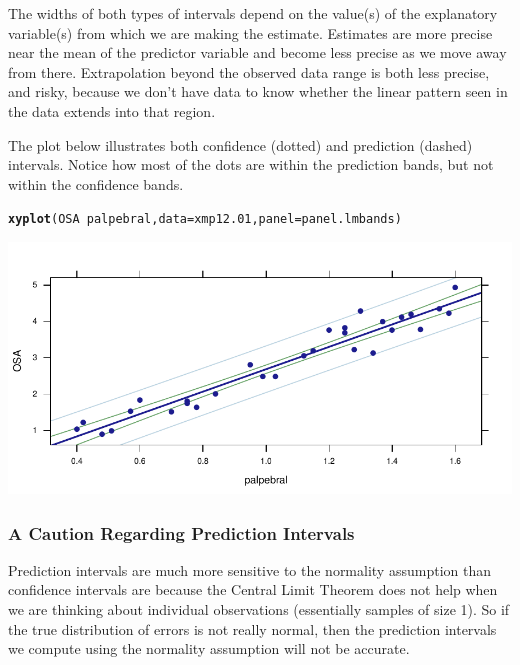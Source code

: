 \documentclass[twoside]{book}\usepackage[]{graphicx}\usepackage[]{xcolor}
\makeatletter
\newcommand{\hlopt}[1]{\textcolor[rgb]{0,0,0}{#1}}%
\newcommand{\hlstd}[1]{\textcolor[rgb]{0.345,0.345,0.345}{#1}}%
\newcommand{\hlkwc}[1]{\textcolor[rgb]{0.333,0.667,0.333}{#1}}%
\newcommand{\hlkwd}[1]{\textcolor[rgb]{0.737,0.353,0.396}{\textbf{#1}}}%
\newenvironment{kframe}{%
 \def\at@end@of@kframe{}%
 \ifinner\ifhmode%
  \def\at@end@of@kframe{\end{minipage}}%
  \begin{minipage}{\columnwidth}%
 \fi\fi%
 \def\FrameCommand##1{\hskip\@totalleftmargin \hskip-\fboxsep
 \colorbox{shadecolor}{##1}\hskip-\fboxsep
     \hskip-\linewidth \hskip-\@totalleftmargin \hskip\columnwidth}%
 \MakeFramed {\advance\hsize-\width
   \@totalleftmargin\z@ \linewidth\hsize
   \@setminipage}}%
 {\par\unskip\endMakeFramed%
 \at@end@of@kframe}
\newenvironment{knitrout}{}{} %
\makeatother
\begin{document}
The widths of both types of intervals depend on the value(s) of the explanatory
variable(s) from which we are making the estimate.  Estimates are more
precise near the mean of the predictor variable and become less precise as we move
away from there.  Extrapolation beyond the observed data range is both less precise, and risky,
because we don't have data to know whether the linear pattern seen in the data
extends into that region.

The plot below illustrates both confidence (dotted) and prediction (dashed) 
intervals.
Notice how most of the dots are within the prediction bands, but not within the 
confidence bands.
\begin{knitrout}
\color{fgcolor}\begin{kframe}
\begin{alltt}
\hlkwd{xyplot}\hlstd{( OSA} \hlopt{~} \hlstd{palpebral,} \hlkwc{data}\hlstd{=xmp12.01,} \hlkwc{panel}\hlstd{=panel.lmbands )}
\end{alltt}
\end{kframe}

{\centering \includegraphics[width=.9\textwidth]{figures/fig-unnamed-chunk-179-1} 

}



\end{knitrout}

\subsubsection{A Caution Regarding Prediction Intervals}
Prediction intervals are much more sensitive to the normality assumption
than confidence intervals are because the Central Limit Theorem does not 
help when we are thinking about individual observations (essentially samples of 
size 1).  So if the true distribution of errors is not really normal, then the prediction intervals we compute using the normality assumption will not be accurate.
\end{document}
